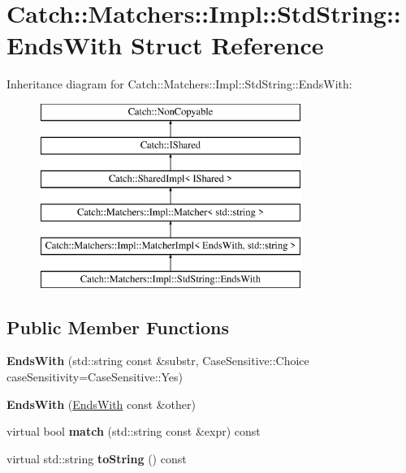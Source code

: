 \hypertarget{structCatch_1_1Matchers_1_1Impl_1_1StdString_1_1EndsWith}{}\section{Catch\+:\+:Matchers\+:\+:Impl\+:\+:Std\+String\+:\+:Ends\+With Struct Reference}
\label{structCatch_1_1Matchers_1_1Impl_1_1StdString_1_1EndsWith}
Inheritance diagram for Catch\+:\+:Matchers\+:\+:Impl\+:\+:Std\+String\+:\+:Ends\+With\+:\begin{figure}[H]
\begin{center}
\leavevmode
\includegraphics[height=6.000000cm]{structCatch_1_1Matchers_1_1Impl_1_1StdString_1_1EndsWith}
\end{center}
\end{figure}
\subsection*{Public Member Functions}
\begin{DoxyCompactItemize}
\item 
{\bfseries Ends\+With} (std\+::string const \&substr, Case\+Sensitive\+::\+Choice case\+Sensitivity=Case\+Sensitive\+::\+Yes)\hypertarget{structCatch_1_1Matchers_1_1Impl_1_1StdString_1_1EndsWith_ae90c02ff06c9dd5e62218b2b521e8cab}{}\label{structCatch_1_1Matchers_1_1Impl_1_1StdString_1_1EndsWith_ae90c02ff06c9dd5e62218b2b521e8cab}

\item 
{\bfseries Ends\+With} (\hyperlink{structCatch_1_1Matchers_1_1Impl_1_1StdString_1_1EndsWith}{Ends\+With} const \&other)\hypertarget{structCatch_1_1Matchers_1_1Impl_1_1StdString_1_1EndsWith_a9321aac07fb17613a7993e99003b3be2}{}\label{structCatch_1_1Matchers_1_1Impl_1_1StdString_1_1EndsWith_a9321aac07fb17613a7993e99003b3be2}

\item 
virtual bool {\bfseries match} (std\+::string const \&expr) const \hypertarget{structCatch_1_1Matchers_1_1Impl_1_1StdString_1_1EndsWith_ad0e03d7f54ffa5859f84faebccf11e76}{}\label{structCatch_1_1Matchers_1_1Impl_1_1StdString_1_1EndsWith_ad0e03d7f54ffa5859f84faebccf11e76}

\item 
virtual std\+::string {\bfseries to\+String} () const \hypertarget{structCatch_1_1Matchers_1_1Impl_1_1StdString_1_1EndsWith_a54715c94c215a1fc5fb6336acf52eb06}{}\label{structCatch_1_1Matchers_1_1Impl_1_1StdString_1_1EndsWith_a54715c94c215a1fc5fb6336acf52eb06}

\end{DoxyCompactItemize}
